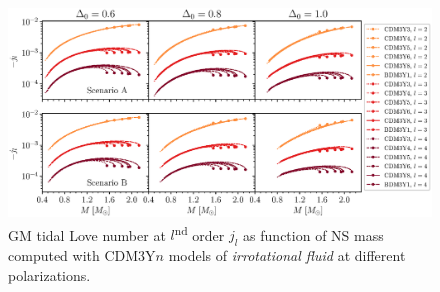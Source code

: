 \begin{figure}[ht!]
        \centering
        \includegraphics[width=\textwidth]{fig/jl_irrot.eps}
        \caption{\gls{GM} tidal Love number at $l$\textsuperscript{nd} order $j_l$ as function of \gls{NS} mass computed with CDM3Y$n$ models of \emph{irrotational fluid} at different polarizations.}
        \label{fig:jl_irrot}
\end{figure} 
